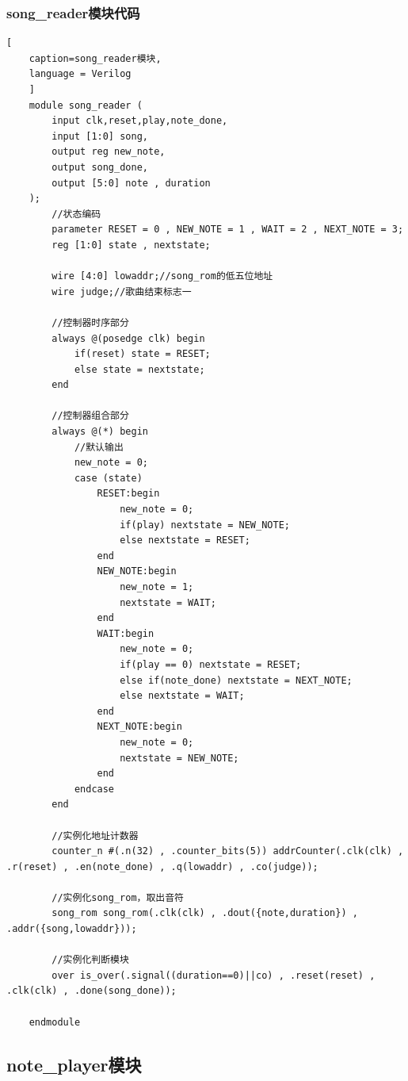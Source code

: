 \documentclass{ctexart}
\begin{document}
            \subsubsection{song_reader模块代码}
\begin{lstlisting}[
    caption=song_reader模块,
    language = Verilog
    ]
    module song_reader (
        input clk,reset,play,note_done,
        input [1:0] song,
        output reg new_note,
        output song_done,
        output [5:0] note , duration
    );
        //状态编码
        parameter RESET = 0 , NEW_NOTE = 1 , WAIT = 2 , NEXT_NOTE = 3;
        reg [1:0] state , nextstate;
    
        wire [4:0] lowaddr;//song_rom的低五位地址
        wire judge;//歌曲结束标志一
        
        //控制器时序部分
        always @(posedge clk) begin
            if(reset) state = RESET;
            else state = nextstate;
        end
    
        //控制器组合部分
        always @(*) begin
            //默认输出
            new_note = 0;
            case (state)
                RESET:begin
                    new_note = 0;
                    if(play) nextstate = NEW_NOTE;
                    else nextstate = RESET;
                end
                NEW_NOTE:begin
                    new_note = 1;
                    nextstate = WAIT;
                end  
                WAIT:begin
                    new_note = 0;
                    if(play == 0) nextstate = RESET;
                    else if(note_done) nextstate = NEXT_NOTE;
                    else nextstate = WAIT;
                end
                NEXT_NOTE:begin
                    new_note = 0;
                    nextstate = NEW_NOTE;
                end
            endcase
        end
    
        //实例化地址计数器
        counter_n #(.n(32) , .counter_bits(5)) addrCounter(.clk(clk) , .r(reset) , .en(note_done) , .q(lowaddr) , .co(judge));
        
        //实例化song_rom，取出音符
        song_rom song_rom(.clk(clk) , .dout({note,duration}) , .addr({song,lowaddr}));
    
        //实例化判断模块
        over is_over(.signal((duration==0)||co) , .reset(reset) , .clk(clk) , .done(song_done));
    
    endmodule
\end{lstlisting}

    \subsection{note_player模块}
\end{document}
